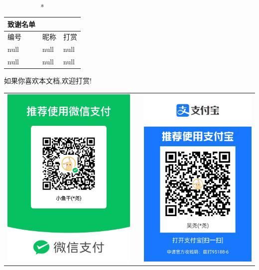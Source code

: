 \newpage
\frontmatter
\thispagestyle{empty}

\begin{longtable}{m{3cm}<{\centering}m{5cm}<{\centering}m{3cm}<{\centering}}
	\caption*{{\LARGE 致谢名单}} \\ \toprule
	编号 & 昵称  & 打赏 \\ \midrule
	null & null & null  \\
	null & null & null \\ 
	\bottomrule
\end{longtable}

\begin{center}	
	如果你喜欢本文档,欢迎打赏! \\[1pt]
	\begin{tabular}{ccc}
		\includegraphics[width=.2\linewidth]{00chapter/wxpng}   & \qquad  \qquad &
		\includegraphics[width=.2\linewidth]{00chapter/zfbpng}  
	\end{tabular}
\end{center}